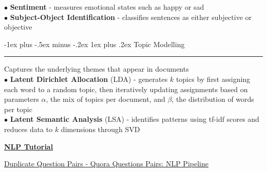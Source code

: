 \documentclass[letterpaper, 10.5pt,landscape]{article}
\makeatletter
\renewcommand{\section}{\@startsection{section}{1}{0mm}%
                                {-1ex plus -.5ex minus -.2ex}%
                                {0.1ex plus .2ex}%
                                {\normalfont\small}}
\renewcommand{\subsubsection}{\@startsection{subsubsection}{3}{0mm}%
                                {-1ex plus -.5ex minus -.2ex}%
                                {1ex plus .2ex}%
                                {\normalfont\small\bfseries}}
\makeatother
\begin{document}
\begin{multicols*}{3}
$\bullet$ \textbf{Sentiment} - measures emotional states such as happy or sad \\
$\bullet$ \textbf{Subject-Object Identification} - classifies sentences as either subjective or objective



\subsubsection{Topic Modelling}  {\color{teal}\hrule height 0.5pt} \smallskip
Captures the underlying themes that appear in documents\\
$\bullet$ \textbf{Latent Dirichlet Allocation} (LDA) - generates $k$ topics by first assigning each word to a random topic, then iteratively updating assignments based on parameters $\alpha$, the mix of topics per document, and $\beta$, the distribution of words per topic \\

$\bullet$ \textbf{Latent Semantic Analysis} (LSA) - identifies patterns using tf-idf scores and reduces data to $k$ dimensions through SVD

\vspace{10pt}

\href{https://www.youtube.com/watch?v=ruyyyRp79uQ&list=PLkz_y24mlSJarFAx94xU17AJ7QJNG1Erl}{\textbf{NLP Tutorial}}

\href{https://www.youtube.com/watch?v=1fvQU5yPjFs&list=PLKnIA16_RmvZo7fp5kkIth6nRTeQQsjfX&index=8}{Duplicate Question Pairs - Quora Questions Pairs: NLP Pipeline}







\vspace*{\fill}






\nocite{LSTM_languageModeling} 
\nocite{LSTMwind}
\nocite{analog-dialogue}
\nocite{deeplearning-ai-nlp}
\nocite{kaggle-nlp-pipelines}
\nocite{bobade2016survey}
\nocite{beakta2015big}
\nocite{edureka-hadoop-questions}
\nocite{edureka-mapreduce-tutorial}


\printbibliography





















\end{multicols*}
\end{document}
